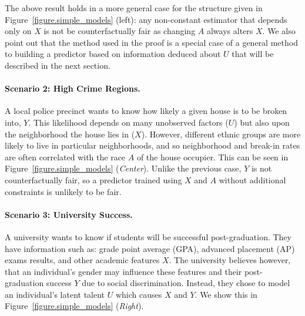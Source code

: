 The above result holds in a more general case for the structure given
in Figure~\ref{figure.simple_models} (left): any non-constant estimator that
depends only on $X$ is not be counterfactually fair as changing $A$ always alters $X$.
We also point out that the method used in the proof is a special case
of a general method to building a predictor based on information deduced
about $U$ that will be described in the next section.
%
%
\paragraph{Scenario 2: High Crime Regions.} 
A local police precinct wants to know how likely a given house is to be broken into, $Y$. This likelihood depends on many unobserved factors
($U$) but also upon the neighborhood the house lies in ($X$). However, different ethnic groups are more likely to live in particular neighborhoods, and so neighborhood and break-in rates are often correlated with the 
race $A$ of the house occupier. This can be seen in Figure~\ref{figure.simple_models} (\emph{Center}). Unlike the previous case, $Y$ is not counterfactually fair, so a predictor trained using $X$ and $A$ without additional constraints is unlikely to be fair. 



\paragraph{Scenario 3: University Success.}
A university wants to know if students will be successful post-graduation. They have information such as: grade point average (GPA), advanced placement (AP) exams results, and other academic features $X$. The university believes however, that an individual's gender may influence these features and their post-graduation success $Y$ due to social discrimination. Instead, they chose to model an individual's latent talent $U$ which causes $X$ and $Y$. We show this in Figure~\ref{figure.simple_models} (\emph{Right}).



